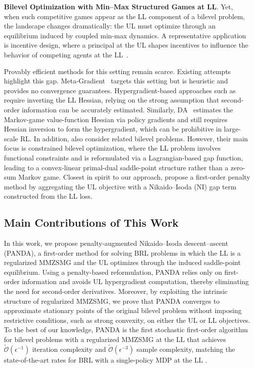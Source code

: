\documentclass{article}
\theoremstyle{plain}
\theoremstyle{definition}
\theoremstyle{remark}
\def\cO{\mathcal O}
\begin{document}
\vspace{-1mm}
\textbf{Bilevel Optimization with Min--Max Structured Games at LL}.
Yet, when such competitive games appear as the LL component of a bilevel problem, the landscape changes dramatically: the UL must optimize through an equilibrium induced by coupled min-max dynamics. A representative application is incentive design, where a principal at the UL shapes incentives to influence the behavior of competing agents at the LL~\citep{yang2020learning,liu2022inducing,yang2022adaptive}.

Provably efficient methods for this setting remain scarce. Existing attempts highlight this gap. Meta-Gradient~\citep{yang2022adaptive} targets this setting but is heuristic and provides no convergence guarantees. Hypergradient-based approaches such as \citet{liu2022inducing} require inverting the LL Hessian, relying on the strong assumption that second-order information can be accurately estimated. Similarly, DA~\citep{wang2023differentiable} estimates the Markov-game value-function Hessian via policy gradients and still requires Hessian inversion to form the hypergradient, which can be prohibitive in large-scale RL. In addition, \citet{yao2024overcoming} also consider related bilevel problems. However, their main focus is constrained bilevel optimization, where the LL problem involves functional constraints and is reformulated via a Lagrangian-based gap function, leading to a convex-linear primal-dual saddle-point structure rather than a zero-sum Markov game. Closest in spirit to our approach, \citet{shen2025principled} propose a first-order penalty method by aggregating the UL objective with a Nikaido--Isoda (NI) gap term constructed from the LL loss.


\vspace{-2mm}
\subsection{Main Contributions of This Work}
\vspace{-1mm}

In this work, we propose penalty-augmented Nikaido–Isoda descent–ascent (PANDA), a first-order method for solving BRL problems in which the LL is a regularized MMZSMG and the UL optimizes through the induced saddle-point equilibrium. Using a penalty-based reformulation, PANDA relies only on first-order information and avoids UL hypergradient computation, thereby eliminating the need for second-order derivatives. Moreover, by exploiting the intrinsic structure of regularized MMZSMG, we prove that PANDA converges to approximate stationary points of the original bilevel problem without imposing restrictive conditions, such as strong convexity, on either the UL or LL objectives. To the best of our knowledge, PANDA is the first stochastic first-order algorithm for bilevel problems with a regularized MMZSMG at the LL that achieves $\tilde{\cO}(\epsilon^{-1})$ iteration complexity and $\tilde{\cO}(\epsilon^{-3})$ sample complexity, matching the state-of-the-art rates for BRL with a single-policy MDP at the LL \citep{gaur2025on}.
\end{document}
